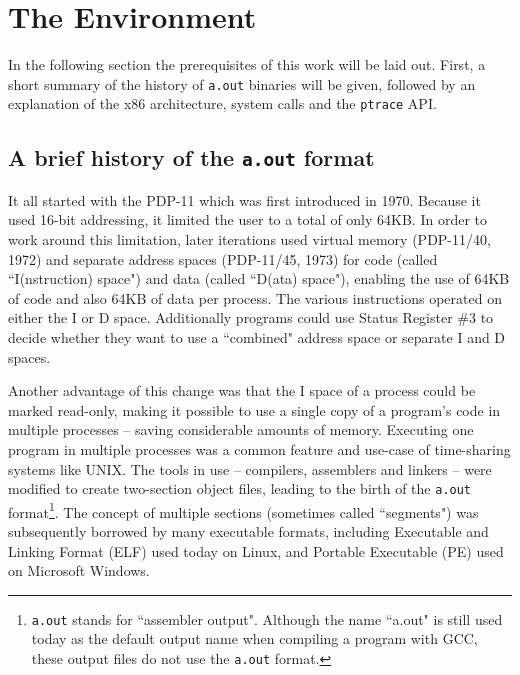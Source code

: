\documentclass{article}
\begin{document}
\section{The Environment}
\label{environment}

In the following section the prerequisites of this work will be laid out. First, a short summary of the history of \texttt{a.out} binaries will be given, followed by an explanation of the x86 architecture, system calls and the \texttt{ptrace} API.

\subsection{A brief history of the \texttt{a.out} format}
\label{history}

It all started with the PDP-11 which was first introduced in 1970. Because it used 16-bit addressing, it limited the user to a total of only 64KB. In order to work around this limitation, later iterations used virtual memory (PDP-11/40, 1972\cite[page 6-2]{PDP1140Handbook}) and separate address spaces (PDP-11/45, 1973) for code (called ``I(nstruction) space") and data (called ``D(ata) space")\cite[page 145]{PDP1145Handbook}, enabling the use of 64KB of code and also 64KB of data per process. The various instructions operated on either the I or D space. Additionally programs could use Status Register \#3 to decide whether they want to use a ``combined" address space or separate I and D spaces.

Another advantage \cite[page 50]{Levine} of this change was that the I space of a process could be marked read-only, making it possible to use a single copy of a program's code in multiple processes -- saving considerable amounts of memory. Executing one program in multiple processes was a common feature and use-case of time-sharing systems like UNIX. The tools in use  -- compilers, assemblers and linkers -- were modified to create two-section object files, leading to the birth of the \texttt{a.out} format\footnote{\texttt{a.out} stands for ``assembler output". Although the name ``a.out" is still used today as the default output name when compiling a program with GCC, these output files do not use the \texttt{a.out} format.\cite{RitchieCLangDev}}. The concept of multiple sections (sometimes called ``segments") was subsequently borrowed by many executable formats, including Executable and Linking Format (ELF)\cite{ElfManPage} used today on Linux, and Portable Executable (PE) used on Microsoft Windows.
\end{document}
